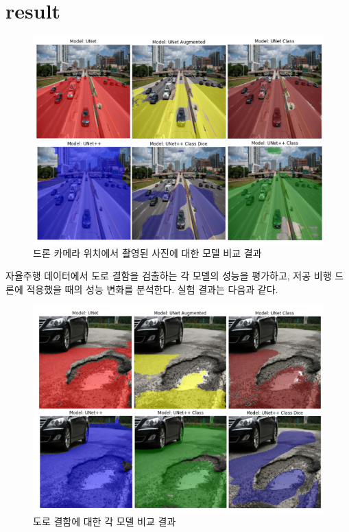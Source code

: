 
\section{result}

\begin{figure}[!h]
    \centering
    \includegraphics[width=1\linewidth]{dron_view.png} %
    \caption{드론 카메라 위치에서 촬영된 사진에 대한 모델 비교 결과} %
    \label{fig:road_detection} %
\end{figure}

자율주행 데이터에서 도로 결함을 검출하는 각 모델의 성능을 평가하고, 저공 비행 드론에 적용했을 때의 성능 변화를 분석한다. 실험 결과는 다음과 같다.
\begin{figure}[!h]
    \centering
    \includegraphics[width=1\linewidth]{lane_crack.png} %
    \caption{도로 결함에 대한 각 모델 비교 결과} %
    \label{fig:crack_detection} %
\end{figure}

